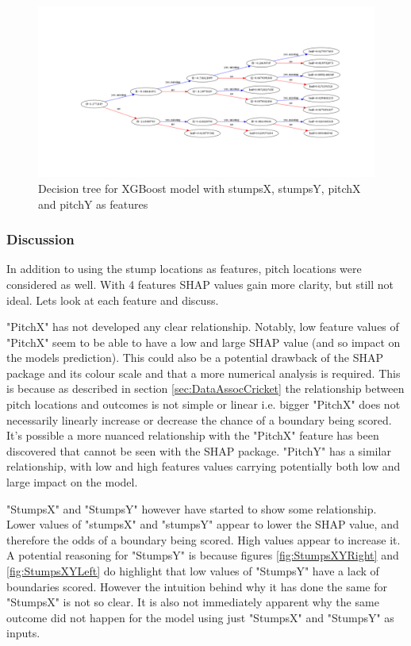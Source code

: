 \documentclass[12pt,a4paper]{report}
\theoremstyle{definition}
\begin{document}
\begin{figure}[H]
    \centering
    \includegraphics[width=\linewidth]{tree_stumps_pitch.png}
    \caption{Decision tree for XGBoost model with stumpsX, stumpsY, pitchX and pitchY as features}
    \label{fig:TreeStumpsPitch}
\end{figure}

\subsubsection{Discussion}

In addition to using the stump locations as features, pitch locations were considered as well.
With 4 features SHAP values gain more clarity, but still not ideal.
Lets look at each feature and discuss.

"PitchX" has not developed any clear relationship. 
Notably, low feature values of "PitchX" seem to be able to have a low and large SHAP value (and so impact on the models prediction).
This could also be a potential drawback of the SHAP package and its colour scale and that a more numerical analysis is required.
This is because as described in section \ref{sec:DataAssocCricket} the relationship between pitch locations and outcomes is not simple or linear i.e. bigger "PitchX" does not necessarily linearly increase or decrease the chance of a boundary being scored.
It's possible a more nuanced relationship with the "PitchX" feature has been discovered that cannot be seen with the SHAP package.
"PitchY" has a similar relationship, with low and high features values carrying potentially both low and large impact on the model.

"StumpsX" and "StumpsY" however have started to show some relationship.
Lower values of "stumpsX" and "stumpsY" appear to lower the SHAP value, and therefore the odds of a boundary being scored.
High values appear to increase it. 
A potential reasoning for "StumpsY" is because figures \ref{fig:StumpsXYRight} and \ref{fig:StumpsXYLeft} do highlight that low values of "StumpsY" have a lack of boundaries scored.
However the intuition behind why it has done the same for "StumpsX" is not so clear. 
It is also not immediately apparent why the same outcome did not happen for the model using just "StumpsX" and "StumpsY" as inputs.
\end{document}
